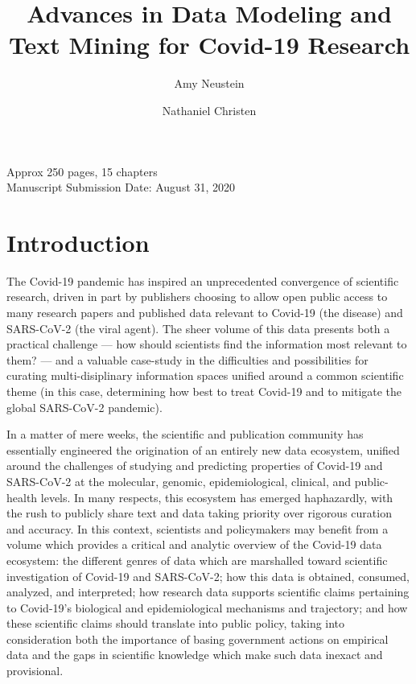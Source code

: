 \documentclass{statsoc}
\title[Data Modeling and Text Mining for Covid-19]{Advances in Data Modeling and Text Mining for Covid-19 Research}
\author[Amy Neustein]{Amy Neustein}
\author[Amy Neustein]{Nathaniel Christen}
\newcommand{\p}[1]{

\vspace{.75em}#1}
\begin{document}
\vspace{1em}
\noindent{}Approx 250 pages, 15 chapters\\
Manuscript Submission Date: August 31, 2020\\

{\fontsize{10}{14}\selectfont
\section{Introduction}

\p{The Covid-19 pandemic has inspired an unprecedented 
convergence of scientific research, driven in part 
by publishers choosing to allow open public access 
to many research papers and published data 
relevant to Covid-19 (the disease) and SARS-CoV-2 
(the viral agent).  The sheer volume of this data 
presents both a practical challenge --- how should 
scientists find the information most relevant to them? 
--- and a valuable case-study in the difficulties and 
possibilities for curating multi-disiplinary 
information spaces unified around a common 
scientific theme (in this case, 
determining how best to treat Covid-19 and to 
mitigate the global SARS-CoV-2 pandemic).}

\p{In a matter of mere weeks, the scientific and publication 
community has essentially engineered the origination of 
an entirely new data ecosystem, unified around the 
challenges of studying and predicting properties 
of Covid-19 and SARS-CoV-2 at the molecular, genomic, 
epidemiological, clinical, and public-health levels.  
In many respects, this ecosystem has emerged 
haphazardly, with the rush to publicly share 
text and data taking priority over rigorous 
curation and accuracy.  In this context, 
scientists and policymakers may benefit from a 
volume which provides a critical and analytic 
overview of the Covid-19 data ecosystem: the 
different genres of data which are marshalled 
toward scientific investigation of Covid-19 
and SARS-CoV-2; how this data is obtained, 
consumed, analyzed, and interpreted; how 
research data supports scientific claims 
pertaining to Covid-19's biological and 
epidemiological mechanisms and trajectory; 
and how these scientific claims should 
translate into public policy, taking into 
consideration both the importance of 
basing government actions on empirical data and 
the gaps in scientific knowledge which make 
such data inexact and provisional.} 

}
\end{document}
